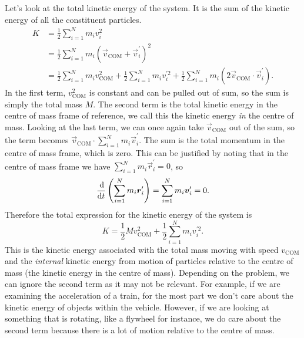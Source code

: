 \documentclass[../classical_mechanics.tex]{subfiles}
\begin{document}
        Let's look at the total kinetic energy of the system.
        It is the sum of the kinetic energy of all the constituent particles.
        \begin{align}
            K&=\frac{1}{2}\sum_{i=1}^N m_iv_i^2\\
            &=\frac{1}{2}\sum_{i=1}^N m_i(\vec{v}_\text{COM}+\vec{v}_i^\prime)^2\\
            &=\frac{1}{2}\sum_{i=1}^N m_i v_\text{COM}^2+\frac{1}{2}\sum_{i=1}^N m_i v_i^{\prime 2}+\frac{1}{2}\sum_{i=1}^N m_i(2\vec{v}_\text{COM}\cdot\vec{v}_i^\prime).
        \end{align}
        In the first term, $v_\text{COM}^2$ is constant and can be pulled out of sum, so the sum is simply the total mass $M$.
        The second term is the total kinetic energy in the centre of mass frame of reference, we call this the kinetic energy \textit{in} the centre of mass.
        Looking at the last term, we can once again take $\vec{v}_\text{COM}$ out of the sum, so the term becomes $\vec{v}_\text{COM}\cdot\sum_{i=1}^N m_i\vec{v}_i^\prime$.
        The sum is the total momentum in the centre of mass frame, which is zero.
        This can be justified by noting that in the centre of mass frame we have $\sum_{i=1}^N m_i\vec{r}_i^\prime=0$, so
        \begin{equation}
            \dv{}{t}\left(\sum_{i=1}^N m_i\vec{r}_i^\prime\right)=\sum_{i=1}^N m_i\vec{v}_i^\prime=0.
        \end{equation}
        Therefore the total expression for the kinetic energy of the system is
        \begin{equation}
            K=\frac{1}{2}M v_\text{COM}^2+\frac{1}{2}\sum_{i=1}^N m_i v_i^{\prime 2}.
        \end{equation}
        This is the kinetic energy associated with the total mass moving with speed $v_\text{COM}$ and the \textit{internal} kinetic energy from motion of particles relative to the centre of mass (the kinetic energy in the centre of mass).
        Depending on the problem, we can ignore the second term as it may not be relevant.
        For example, if we are examining the acceleration of a train, for the most part we don't care about the kinetic energy of objects within the vehicle.
        However, if we are looking at something that is rotating, like a flywheel for instance, we do care about the second term because there is a lot of motion relative to the centre of mass.
\end{document}

